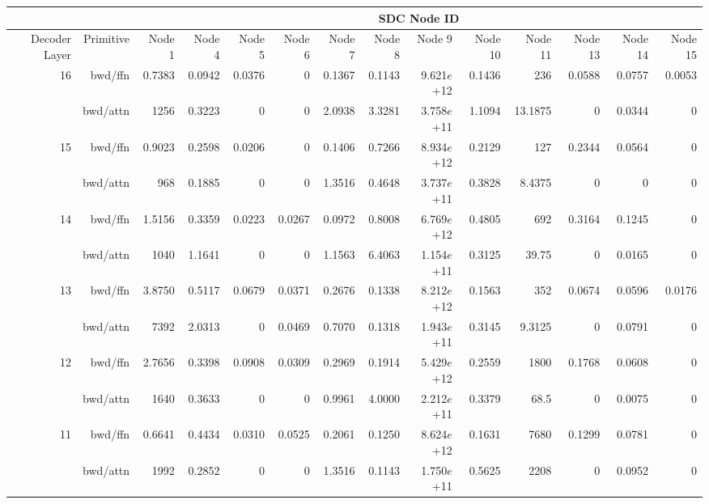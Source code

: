 \begin{table*}[t]


\begin{center}
\begin{tiny}
\begin{sc}


\setlength{\tabcolsep}{2pt}
\begin{tabular}{rrrrrrrrrrrrrr}
\toprule
 & & \multicolumn{12}{c}{SDC Node ID} \\
 \midrule
 Decoder Layer & Primitive & Node 1 & Node 4 & Node 5 & Node 6 & Node 7 & Node 8 & Node 9 & Node 10 & Node 11 & Node 13 & Node 14 & Node 15 \\
 \midrule
\multirow{2}{*}{16} & bwd/ffn & 0.7383 & 0.0942 & 0.0376 & 0 & 0.1367 & 0.1143 & 9.621$e$+12 & 0.1436 & 236 & 0.0588 & 0.0757 & 0.0053 \\
 & bwd/attn & 1256 & 0.3223 & 0 & 0 & 2.0938 & 3.3281 & 3.758$e$+11 & 1.1094 & 13.1875 & 0 & 0.0344 & 0 \\
\midrule
\multirow{2}{*}{15} & bwd/ffn & 0.9023 & 0.2598 & 0.0206 & 0 & 0.1406 & 0.7266 & 8.934$e$+12 & 0.2129 & 127 & 0.2344 & 0.0564 & 0 \\
 & bwd/attn & 968 & 0.1885 & 0 & 0 & 1.3516 & 0.4648 & 3.737$e$+11 & 0.3828 & 8.4375 & 0 & 0 & 0 \\
\midrule
\multirow{2}{*}{14} & bwd/ffn & 1.5156 & 0.3359 & 0.0223 & 0.0267 & 0.0972 & 0.8008 & 6.769$e$+12 & 0.4805 & 692 & 0.3164 & 0.1245 & 0 \\
 & bwd/attn & 1040 & 1.1641 & 0 & 0 & 1.1563 & 6.4063 & 1.154$e$+11 & 0.3125 & 39.75 & 0 & 0.0165 & 0 \\
\midrule
\multirow{2}{*}{13}& bwd/ffn & 3.8750 & 0.5117 & 0.0679 & 0.0371 & 0.2676 & 0.1338 & 8.212$e$+12 & 0.1563 & 352 & 0.0674 & 0.0596 & 0.0176 \\
 & bwd/attn & 7392 & 2.0313 & 0 & 0.0469 & 0.7070 & 0.1318 & 1.943$e$+11 & 0.3145 & 9.3125 & 0 & 0.0791 & 0 \\
\midrule
\multirow{2}{*}{12} & bwd/ffn & 2.7656 & 0.3398 & 0.0908 & 0.0309 & 0.2969 & 0.1914 & 5.429$e$+12 & 0.2559 & 1800 & 0.1768 & 0.0608 & 0 \\
 & bwd/attn & 1640 & 0.3633 & 0 & 0 & 0.9961 & 4.0000 & 2.212$e$+11 & 0.3379 & 68.5 & 0 & 0.0075 & 0 \\
\midrule
\multirow{2}{*}{11} & bwd/ffn & 0.6641 & 0.4434 & 0.0310 & 0.0525 & 0.2061 & 0.1250 & 8.624$e$+12 & 0.1631 & 7680 & 0.1299 & 0.0781 & 0 \\
 & bwd/attn & 1992 & 0.2852 & 0 & 0 & 1.3516 & 0.1143 & 1.750$e$+11 & 0.5625 & 2208 & 0 & 0.0952 & 0 \\

\end{tabular}
\end{sc}
\end{tiny}
\end{center}
\end{table*}
